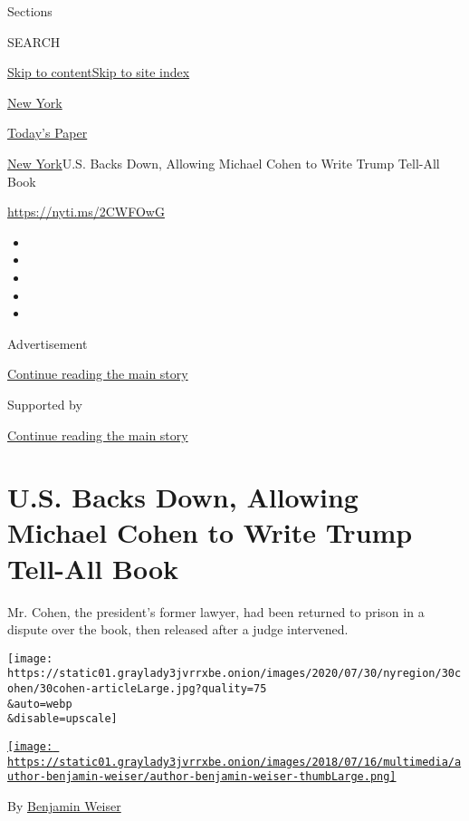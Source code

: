Sections

SEARCH

\protect\hyperlink{site-content}{Skip to
content}\protect\hyperlink{site-index}{Skip to site index}

\href{https://www.nytimes3xbfgragh.onion/section/nyregion}{New York}

\href{https://myaccount.nytimes3xbfgragh.onion/auth/login?response_type=cookie\&client_id=vi}{}

\href{https://www.nytimes3xbfgragh.onion/section/todayspaper}{Today's
Paper}

\href{/section/nyregion}{New York}\textbar{}U.S. Backs Down, Allowing
Michael Cohen to Write Trump Tell-All Book

\url{https://nyti.ms/2CWFOwG}

\begin{itemize}
\item
\item
\item
\item
\item
\end{itemize}

Advertisement

\protect\hyperlink{after-top}{Continue reading the main story}

Supported by

\protect\hyperlink{after-sponsor}{Continue reading the main story}

\hypertarget{us-backs-down-allowing-michael-cohen-to-write-trump-tell-all-book}{%
\section{U.S. Backs Down, Allowing Michael Cohen to Write Trump Tell-All
Book}\label{us-backs-down-allowing-michael-cohen-to-write-trump-tell-all-book}}

Mr. Cohen, the president's former lawyer, had been returned to prison in
a dispute over the book, then released after a judge intervened.

\texttt{[image: https://static01.graylady3jvrrxbe.onion/images/2020/07/30/nyregion/30cohen/30cohen-articleLarge.jpg?quality=75\\\&auto=webp\\\&disable=upscale]}

\href{https://www.nytimes3xbfgragh.onion/by/benjamin-weiser}{\texttt{[image: https://static01.graylady3jvrrxbe.onion/images/2018/07/16/multimedia/author-benjamin-weiser/author-benjamin-weiser-thumbLarge.png]}}

By \href{https://www.nytimes3xbfgragh.onion/by/benjamin-weiser}{Benjamin
Weiser}

